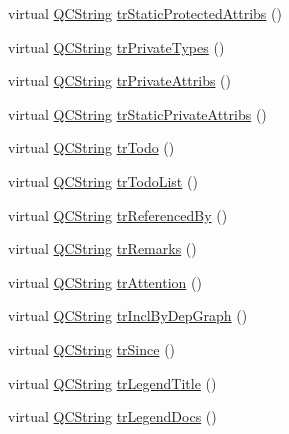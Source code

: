 \begin{DoxyCompactItemize}
\item 
virtual \hyperlink{class_q_c_string}{Q\+C\+String} \hyperlink{class_translator_chinesetraditional_acae97e9ea166c1f631442ef734cca58b}{tr\+Static\+Protected\+Attribs} ()
\item 
virtual \hyperlink{class_q_c_string}{Q\+C\+String} \hyperlink{class_translator_chinesetraditional_a65f324a3ebc1ec2eb7a953f5f81d16b1}{tr\+Private\+Types} ()
\item 
virtual \hyperlink{class_q_c_string}{Q\+C\+String} \hyperlink{class_translator_chinesetraditional_a9c25cc14f67b89f45896926ad8897ae2}{tr\+Private\+Attribs} ()
\item 
virtual \hyperlink{class_q_c_string}{Q\+C\+String} \hyperlink{class_translator_chinesetraditional_a86ca838e617dcacb775585c6b1ef2faf}{tr\+Static\+Private\+Attribs} ()
\item 
virtual \hyperlink{class_q_c_string}{Q\+C\+String} \hyperlink{class_translator_chinesetraditional_a04fc172a8323473e29b8cc520501a635}{tr\+Todo} ()
\item 
virtual \hyperlink{class_q_c_string}{Q\+C\+String} \hyperlink{class_translator_chinesetraditional_ac17ad709071a125acce82c295add2e1f}{tr\+Todo\+List} ()
\item 
virtual \hyperlink{class_q_c_string}{Q\+C\+String} \hyperlink{class_translator_chinesetraditional_a8c0d9e50a1f2c8caba4e6b8528e7f798}{tr\+Referenced\+By} ()
\item 
virtual \hyperlink{class_q_c_string}{Q\+C\+String} \hyperlink{class_translator_chinesetraditional_ad72cef34cf6fe8248ca547850c7b1d33}{tr\+Remarks} ()
\item 
virtual \hyperlink{class_q_c_string}{Q\+C\+String} \hyperlink{class_translator_chinesetraditional_abf715b71b85daede947b0f17f7c29933}{tr\+Attention} ()
\item 
virtual \hyperlink{class_q_c_string}{Q\+C\+String} \hyperlink{class_translator_chinesetraditional_a76f7abad32a21ca2b40977362b2ee192}{tr\+Incl\+By\+Dep\+Graph} ()
\item 
virtual \hyperlink{class_q_c_string}{Q\+C\+String} \hyperlink{class_translator_chinesetraditional_a997a58bda3e61cb0c37257f338db6c51}{tr\+Since} ()
\item 
virtual \hyperlink{class_q_c_string}{Q\+C\+String} \hyperlink{class_translator_chinesetraditional_a4229fcbab46c55b5a8cf3977149c26f3}{tr\+Legend\+Title} ()
\item 
virtual \hyperlink{class_q_c_string}{Q\+C\+String} \hyperlink{class_translator_chinesetraditional_a6813a103a994d36bf508b0b8b03995e7}{tr\+Legend\+Docs} ()

\end{DoxyCompactItemize}
